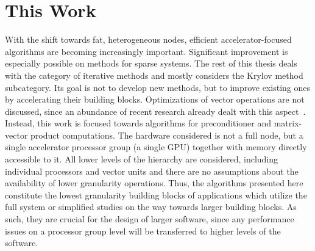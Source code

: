 \section{This Work}

With the shift towards fat, heterogeneous nodes, efficient accelerator-focused
algorithms are becoming increasingly important. Significant improvement is
especially possible on methods for sparse systems. The rest of this thesis deals
with the category of iterative methods and mostly considers the Krylov method
subcategory. Its goal is not to develop new methods, but to improve existing
ones by accelerating their building blocks. Optimizations of vector operations
are not discussed, since an abundance of recent research already dealt with this
aspect~\cite{joaqin-thesis}. Instead, this work is focused towards algorithms
for preconditioner and matrix-vector product computations. The hardware
considered is not a full node, but a single accelerator processor group (\ie a
single GPU) together with memory directly accessible to it. All lower levels of
the hierarchy are considered, including individual processors and vector units
and there are no assumptions about the availability of lower granularity
operations. Thus, the algorithms presented here constitute the lowest
granularity building blocks of applications which utilize the full system or
simplified studies on the way towards larger building blocks. As such, they are
crucial for the design of larger software, since any performance issues on a
processor group level will be transferred to higher levels of the software.

